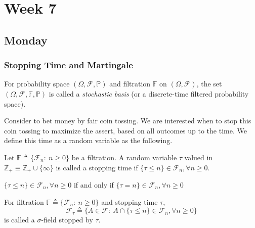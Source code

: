 
\chapter{Week 7}

\section{Monday}
\subsection{Stopping Time and Martingale}


\begin{definition}
For probability space $(\Omega,\mathcal{F},\mathbb{P})$ and filtration $\mathbb{F}$ on $(\Omega,\mathcal{F})$, the set $(\Omega,\mathcal{F},\mathbb{F},\mathbb{P})$ is called a \emph{stochastic basis} (or a discrete-time filtered probability space).
\end{definition}

Consider to bet money by fair coin tossing. 
We are interested when to stop this coin tossing to maximize the assert,
based on all outcomes up to the time.
We define this time as a random variable as the following.

\begin{definition}
Let $\mathbb{F}\triangleq \{\mathcal{F}_n:~n\ge0\}$ be a filtration.
A random variable $\tau$ valued in $\overline{\mathbb{Z}}_+\equiv\mathbb{Z}_+\cup\{\infty\}$
is called a stopping time if $\{\tau\le n\}\in\mathcal{F}_n, \forall n\ge0$.
\end{definition}
\begin{remark}
$\{\tau\le n\}\in\mathcal{F}_n, \forall n\ge0$ if and only if $\{\tau= n\}\in\mathcal{F}_n, \forall n\ge0$
\end{remark}

\begin{definition}
For filtration $\mathbb{F}\triangleq \{\mathcal{F}_n:~n\ge0\}$ and stopping time $\tau$,
\[
\mathcal{F}_\tau \triangleq\{A\in\mathcal{F}:~A\cap\{\tau\le n\}\in\mathcal{F}_n,\forall n\ge0\}
\]
is called a $\sigma$-field stopped by $\tau$.
\end{definition}


